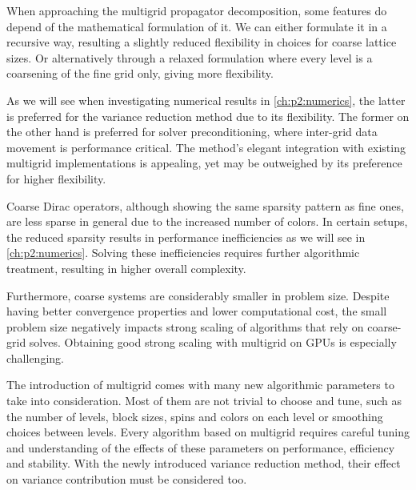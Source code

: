
When approaching the multigrid propagator decomposition, some features do depend of the mathematical formulation of it.
We can either formulate it in a recursive way, resulting a slightly reduced flexibility in choices for coarse lattice sizes.
Or alternatively through a relaxed formulation where every level is a coarsening of the fine grid only, giving more flexibility.

As we will see when investigating numerical results in \cref{ch:p2:numerics}, the latter is preferred for the variance reduction method due to its flexibility.
The former on the other hand is preferred for solver preconditioning, where inter-grid data movement is performance critical.
The method's elegant integration with existing multigrid implementations is appealing, yet may be outweighed by its preference for higher flexibility.

Coarse Dirac operators, although showing the same sparsity pattern as fine ones, are less sparse in general due to the increased number of colors.
In certain setups, the reduced sparsity results in performance inefficiencies as we will see in \cref{ch:p2:numerics}.
Solving these inefficiencies requires further algorithmic treatment, resulting in higher overall complexity.

Furthermore, coarse systems are considerably smaller in problem size.
Despite having better convergence properties and lower computational cost, the small problem size negatively impacts strong scaling of algorithms that rely on coarse-grid solves.
Obtaining good strong scaling with multigrid on GPUs is especially challenging.

The introduction of multigrid comes with many new algorithmic parameters to take into consideration.
Most of them are not trivial to choose and tune, such as the number of levels, block sizes, spins and colors on each level or smoothing choices between levels.
Every algorithm based on multigrid requires careful tuning and understanding of the effects of these parameters on performance, efficiency and stability.
With the newly introduced variance reduction method, their effect on variance contribution must be considered too.

